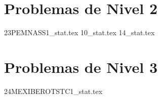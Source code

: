\section{Problemas de Nivel 2}
{23PEMNASS1_stat.tex} %
{10_stat.tex} %
{14_stat.tex} %

\section{Problemas de Nivel 3}
{24MEXIBEROTSTC1_stat.tex} %